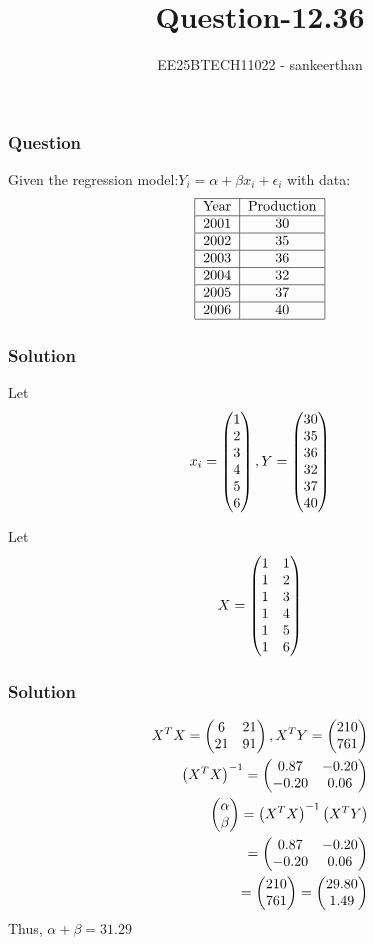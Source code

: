 \documentclass{beamer}
\title{Question-12.36}
\author{EE25BTECH11022 - sankeerthan}
\date{}
\begin{document}
\frame{\titlepage}

\begin{frame}
\frametitle{Question}
Given the regression model:$Y_i = \alpha + \beta x_i + \epsilon_i$ with data:  \\ \begin{align}
\begin{tabular}{|c|c|}\hline
\text{Year} & \text{Production} \\ \hline
2001 & 30 \\ \hline
2002 & 35 \\ \hline
2003 & 36 \\ \hline
2004 & 32 \\ \hline
2005 & 37 \\ \hline
2006 & 40 \\ \hline
\end{tabular}
\end{align}
\end{frame}

\begin{frame}
\frametitle{Solution}
Let
\begin{align}
x_i = \begin{pmatrix}1 \\ 2 \\ 3 \\ 4 \\ 5 \\ 6\end{pmatrix}, Y = \begin{pmatrix}30 \\ 35 \\ 36 \\ 32 \\ 37 \\ 40\end{pmatrix}
\end{align}

Let
\begin{align}
X = \begin{pmatrix}1 & 1 \\1 & 2 \\1 & 3 \\1 & 4 \\1 & 5 \\1 & 6\end{pmatrix}
\end{align}
\end{frame}

\begin{frame}
\frametitle{Solution}
\begin{align}
X^T X =\begin{pmatrix}6 & 21 \\21 & 91\end{pmatrix},X^T Y =\begin{pmatrix}210 \\761\end{pmatrix} \\
\left(X^T X\right)^{-1} =\begin{pmatrix}0.87 & -0.20 \\-0.20 & 0.06\end{pmatrix} \\
\begin{pmatrix}\alpha \\\beta\end{pmatrix}= \left(X^T X\right)^{-1}\left(X^T Y\right) \\
=\begin{pmatrix}0.87 & -0.20 \\-0.20 & 0.06\end{pmatrix} \\
=\begin{pmatrix}210 \\761\end{pmatrix}=\begin{pmatrix}29.80 \\1.49\end{pmatrix}
\end{align}
Thus, $\alpha + \beta = 31.29$
\end{frame}
\end{document}
